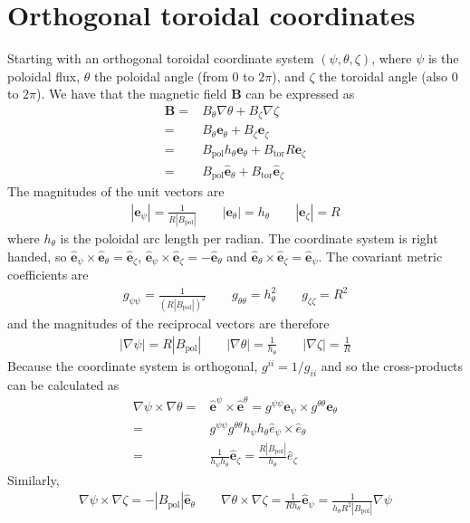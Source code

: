 \documentclass[12pt]{article}
\newcommand{\hthe}{\ensuremath{h_\theta}}
\newcommand{\Bp}{\ensuremath{B_{\text{pol}}}}
\newcommand{\Bt}{\ensuremath{B_{\text{tor}}}}
\newcommand{\ve}[1]{\ensuremath{\boldsymbol{#1}}}
\newcommand{\hv}[1]{\hat{\ve{#1}}}
\newcommand{\Bvec}{\ve{B}}
\begin{document}
\section{Orthogonal toroidal coordinates}
\label{sec:coordinates}
Starting with an orthogonal toroidal coordinate system $\left(\psi, \theta,
\zeta\right)$, where $\psi$ is the poloidal flux, $\theta$ the poloidal angle
(from $0$ to $2\pi$), and $\zeta$ the toroidal angle (also $0$ to $2\pi$). We 
have that the magnetic field $\Bvec$ can be expressed as
%
\begin{align*}
 \Bvec =& B_\theta \nabla \theta + B_\zeta \nabla \zeta\\
       =& B_\theta \ve{e}_\theta + B_\zeta \ve{e}_\zeta\\
       =& \Bp h_\theta \ve{e}_\theta + \Bt R \ve{e}_\zeta\\
       =& \Bp \hv{e}_\theta + \Bt \hv{e}_\zeta
\end{align*}
%
The magnitudes of the unit vectors are
%
\begin{align*}
\left|\ve{e}_\psi\right| = \frac{1}{R\left|\Bp\right|} \qquad
\left|\ve{e}_\theta\right| = \hthe \qquad
\left|\ve{e}_\zeta\right| = R
\end{align*}
%
where $\hthe$ is the poloidal arc length per radian.
The coordinate system is right handed, so
$\hv{e}_\psi\times\hv{e}_\theta = \hv{e}_\zeta$,
$\hv{e}_\psi\times\hv{e}_\zeta = -\hv{e}_\theta$ and
$\hv{e}_\theta\times\hv{e}_\zeta = \hv{e}_\psi$. The covariant
metric coefficients are
%
\begin{align*}
g_{\psi\psi} = \frac{1}{\left(R\left|\Bp\right|\right)^2} \qquad
g_{\theta\theta} = h_\theta^2 \qquad
g_{\zeta\zeta} = R^2
\end{align*}
%
and the magnitudes of the reciprocal vectors are therefore
%
\begin{align*}
\left|\nabla\psi\right| = R\left|\Bp\right| \qquad
\left|\nabla\theta\right| = \frac{1}{h_\theta} \qquad
\left|\nabla\zeta\right| = \frac{1}{R}
\end{align*}
%
Because the coordinate system is orthogonal, $g^{ii} = 1/g_{ii}$ and so the
cross-products can be calculated as
%
\begin{align*}
\nabla\psi\times\nabla\theta = &\hv{e}^\psi\times \hv{e}^\theta =
g^{\psi\psi}\ve{e}_\psi\times g^{\theta\theta}\ve{e}_\theta \nonumber \\
= & g^{\psi\psi}g^{\theta\theta}h_\psi
h_\theta \hat{e}_\psi\times\hat{e}_\theta \nonumber \\
= &\frac{1}{h_\psi h_\theta}\hv{e}_\zeta
= \frac{R\left|\Bp\right|}{h_\theta}\hat{e}_\zeta
\end{align*}
%
Similarly,
%
\begin{align*}
\nabla\psi\times\nabla\zeta = 
-\left|\Bp\right|\hv{e}_\theta \qquad
\nabla\theta\times\nabla\zeta = \frac{1}{Rh_\theta}\hv{e}_\psi =
\frac{1}{h_\theta R^2\left|\Bp\right|}\nabla \psi
\end{align*}
%
\end{document}
